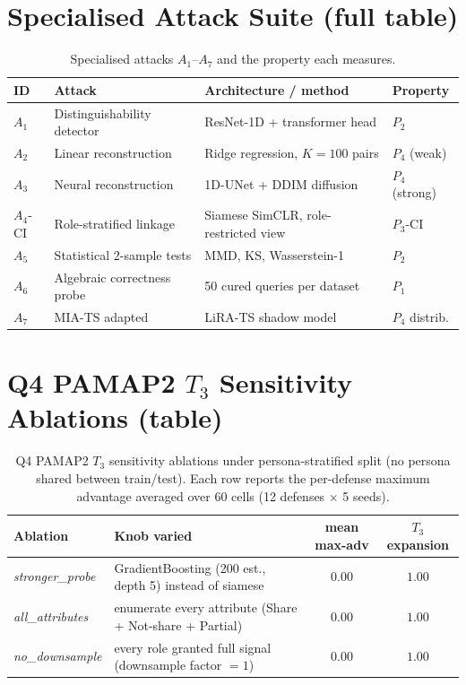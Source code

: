 \documentclass{article}
\theoremstyle{remark}
\newcommand{\PCI}{P_3\text{-CI}}
\begin{document}
\section{Specialised Attack Suite (full table)}
\label{app:attacks}
\begin{table}[h]
\centering
\caption{Specialised attacks $A_1$--$A_7$ and the property each measures.}
\label{tab:attacks}
\small
\begin{tabular}{@{}llll@{}}
\toprule
ID & Attack & Architecture / method & Property \\
\midrule
$A_1$ & Distinguishability detector & ResNet-1D + transformer head & $P_2$ \\
$A_2$ & Linear reconstruction & Ridge regression, $K=100$ pairs & $P_4$ (weak) \\
$A_3$ & Neural reconstruction & 1D-UNet + DDIM diffusion & $P_4$ (strong) \\
$A_4$-CI & Role-stratified linkage & Siamese SimCLR, role-restricted view & $\PCI$ \\
$A_5$ & Statistical 2-sample tests & MMD, KS, Wasserstein-1 & $P_2$ \\
$A_6$ & Algebraic correctness probe & 50 cured queries per dataset & $P_1$ \\
$A_7$ & MIA-TS adapted~\cite{mia_ts} & LiRA-TS shadow model & $P_4$ distrib. \\
\bottomrule
\end{tabular}
\end{table}

\section{Q4 PAMAP2 $T_3$ Sensitivity Ablations (table)}
\begin{table}[h]
\centering
\caption{Q4 PAMAP2 $T_3$ sensitivity ablations under persona-stratified split (no persona shared between train/test). Each row reports the per-defense maximum advantage averaged over 60 cells (12 defenses $\times$ 5 seeds).}
\label{tab:t3_ablation}
\small
\begin{tabular}{@{}llcc@{}}
\toprule
Ablation & Knob varied & mean max-adv & $T_3$ expansion \\
\midrule
\textit{stronger\_probe}  & GradientBoosting (200 est., depth 5) instead of siamese  & $0.00$ & $1.00$ \\
\textit{all\_attributes} & enumerate every attribute (Share + Not-share + Partial)  & $0.00$ & $1.00$ \\
\textit{no\_downsample}  & every role granted full signal (downsample factor $= 1$) & $0.00$ & $1.00$ \\
\bottomrule
\end{tabular}
\end{table}
\end{document}
